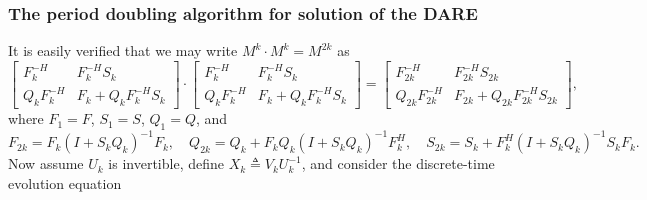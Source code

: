 \begin{figure*}[t]

\end{figure*}

\subsubsection{The period doubling algorithm for solution of the DARE}\label{subsec:Ddoubling}

It is easily verified that we may write $M^k\cdot M^k = M^{2k}$ as
\begin{equation}
\label{eq:idenperdub}
\begin{bmatrix}  F_k^{-H} & F_k^{-H}S_k \\ Q_k F_k^{-H} & F_k+ Q_k F_k^{-H}S_k  \end{bmatrix} \cdot \begin{bmatrix} F_k^{-H} & F_k^{-H}S_k \\ Q_k F_k^{-H} & F_k+ Q_k F_k^{-H}S_k  \end{bmatrix} =
\begin{bmatrix} F_{2k}^{-H} & F_{2k}^{-H}S_{2k} \\ Q_{2k} F_{2k}^{-H} & F_{2k}+ Q_{2k} F_{2k}^{-H}S_{2k} \end{bmatrix},
\end{equation}
where $F_1=F$, $S_1=S$, $Q_1=Q$, and
\begin{equation}
F_{2k} = F_k (I+ S_k Q_k)^{-1} F_k, \quad Q_{2k} = Q_k + F_k Q_k (I+S_k Q_k)^{-1} F^H_k, \quad S_{2k} = S_k + F^H_k (I+S_k Q_k)^{-1}  S_k F_k.
\label{eq:perdubiter}
\end{equation}
Now assume $U_k$ is invertible, define $X_k \triangleq V_k U_k^{-1}$, and consider the discrete-time evolution equation
